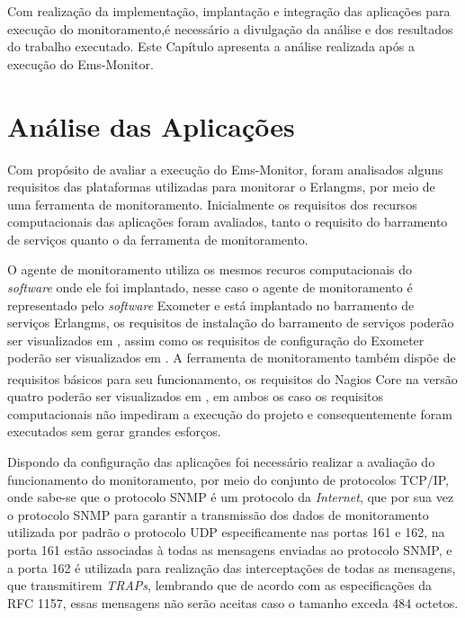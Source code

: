 \label{analise_monitoramento_servicos}

Com realização da implementação, implantação e integração das aplicações para execução do monitoramento,é necessário a divulgação da análise e dos resultados do trabalho executado. Este Capítulo apresenta a análise realizada após a execução do Ems-Monitor.


\section{Análise das Aplicações}
\label{analise}
Com propósito de avaliar a execução do Ems-Monitor, foram analisados alguns requisitos das plataformas utilizadas para monitorar o Erlangms, por meio de uma ferramenta de monitoramento. Inicialmente os requisitos dos recursos computacionais das aplicações foram avaliados, tanto o requisito do barramento de serviços quanto o da ferramenta de monitoramento. 

O agente de monitoramento utiliza os mesmos recuros computacionais do \textit{software} onde ele foi implantado, nesse caso o agente de monitoramento é representado pelo \textit{software} Exometer e está implantado no barramento de serviços Erlangms, os requisitos de instalação do barramento de serviços poderão ser visualizados em \cite{erlangms_gitHub}, assim como os requisitos de configuração do Exometer poderão ser visualizados em \cite{exometer_gitHub}. A ferramenta de monitoramento também dispõe de requisitos básicos para seu funcionamento, os requisitos do Nagios Core\textsuperscript{\textregistered} na versão quatro poderão ser visualizados em \cite{nagios_core_configuration}, em ambos os caso os requisitos computacionais não impediram a execução do projeto e consequentemente foram executados sem gerar grandes esforços.

Dispondo da configuração das aplicações foi necessário realizar a avaliação do funcionamento do monitoramento, por meio do conjunto de protocolos TCP/IP, onde sabe-se que o protocolo \acrshort{SNMP} é um protocolo da \textit{Internet}, que por sua vez o protocolo \acrshort{SNMP} para garantir a transmissão dos dados de monitoramento utilizada por padrão o protocolo UDP especificamente nas portas 161 e 162, na porta 161 estão associadas à todas as mensagens enviadas ao protocolo \acrshort{SNMP}, e a porta 162 é utilizada para realização das interceptações de todas as mensagens, que transmitirem \textit{TRAPs}, lembrando que de acordo com as especificações da RFC 1157, essas mensagens não serão aceitas caso o tamanho exceda 484 octetos\cite{Schoffstall}. 

